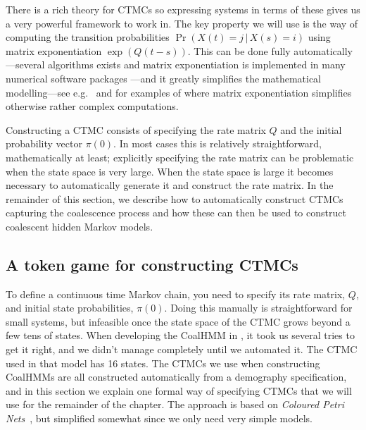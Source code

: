\documentclass[graybox]{svmult}
\begin{document}

There is a rich theory for CTMCs so expressing systems in terms of these gives us a very powerful framework to work in. The key property we will use is the way of computing the transition probabilities $\Pr(X(t)=j\,|\,X(s)=i)$ using matrix exponentiation $\exp\left(Q\left(t-s\right)\right)$. This can be done fully automatically---several algorithms exists and matrix exponentiation is implemented in many numerical software packages \cite{Moler2003}---and it greatly simplifies the mathematical modelling---see e.g.\ \citet{Hobolth:2011hl} and \citet{Andersen:2013iz} for examples of where matrix exponentiation simplifies otherwise rather complex computations.

Constructing a CTMC consists of specifying the rate matrix $Q$ and the initial probability vector $\pi(0)$. In most cases this is relatively straightforward, mathematically at least; explicitly specifying the rate matrix can be problematic when the state space is very large. When the state space is large it becomes necessary to automatically generate it and construct the rate matrix. In the remainder of this section, we describe how to automatically construct CTMCs capturing the coalescence process and how these can then be used to construct coalescent hidden Markov models.

\subsection{A token game for constructing CTMCs}

To define a continuous time Markov chain, you need to specify its rate matrix, $Q$, and initial state probabilities, $\pi(0)$. Doing this manually is straightforward for small systems, but infeasible once the state space of the CTMC grows beyond a few tens of states. When developing the CoalHMM in \citet{Mailund:2011dva}, it took us several tries to get it right, and we didn't manage completely until we automated it. The CTMC used in that model has 16 states. The CTMCs we use when constructing CoalHMMs are all constructed automatically from a demography specification, and in this section we explain one formal way of specifying CTMCs that we will use for the remainder of the chapter. The approach is based on \emph{Coloured Petri Nets}~\cite{Jensen:2013jg}, but simplified somewhat since we only need very simple models.
\end{document}
